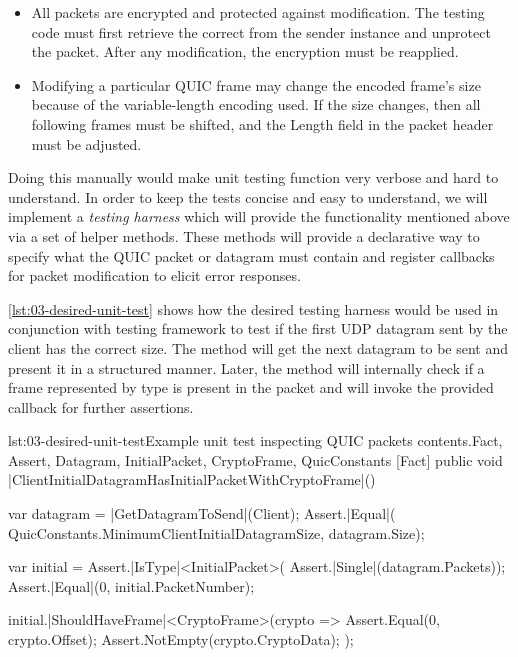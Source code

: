 \begin{itemize}

  \item All packets are encrypted and protected against modification. The testing code must first
retrieve the correct \CryptoSeal{} from the sender \QuicConnection{} instance and unprotect the
packet. After any modification, the encryption must be reapplied.

  \item Modifying a particular QUIC frame may change the encoded frame's size because of the
variable-length encoding used. If the size changes, then all following frames must be shifted, and
the Length field in the packet header must be adjusted.

\end{itemize}

Doing this manually would make unit testing function very verbose and hard to understand. In order
to keep the tests concise and easy to understand, we will implement a \textit{testing harness} which
will provide the functionality mentioned above via a set of helper methods. These methods will
provide a declarative way to specify what the QUIC packet or datagram must contain and register
callbacks for packet modification to elicit error responses.

\autoref{lst:03-desired-unit-test} shows how the desired testing harness would be used in
conjunction with \xUnit{} testing framework to test if the first UDP datagram sent by the client has
the correct size. The  method will get the next datagram to be sent and
present it in a structured manner. Later, the  method will
internally check if a frame represented by  type is present in the packet and will
invoke the provided callback for further assertions.

\begin{myListingCsharp}{lst:03-desired-unit-test}{Example unit test inspecting QUIC packets contents.}{Fact, Assert, Datagram, InitialPacket, CryptoFrame, QuicConstants}{}
    [Fact]
    public void |ClientInitialDatagramHasInitialPacketWithCryptoFrame|()
    {
        var datagram = |GetDatagramToSend|(Client);
        Assert.|Equal|(
            QuicConstants.MinimumClientInitialDatagramSize,
            datagram.Size);

        var initial = Assert.|IsType|<InitialPacket>(
            Assert.|Single|(datagram.Packets));
        Assert.|Equal|(0, initial.PacketNumber);

        initial.|ShouldHaveFrame|<CryptoFrame>(crypto =>
        {
            Assert.Equal(0, crypto.Offset);
            Assert.NotEmpty(crypto.CryptoData);
        });
    }
\end{myListingCsharp}

